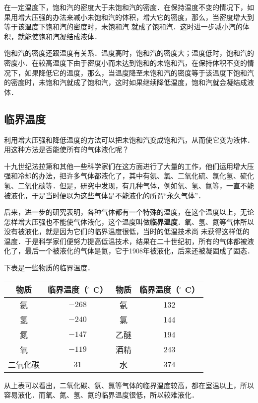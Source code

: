 在一定温度下，饱和汽的密度大于未饱和汽的密度．在保持温度不变的情况下，如果用增大压强的办法来减小未饱和汽的体积，增大它的密度，那么，当密度增大到等于该温度下饱和汽的密度时，未饱和汽
就成了饱和汽．这时进一步减小汽的体积，就能使饱和汽凝结成液体．

饱和汽的密度还跟温度有关系．温度高时，饱和汽的密度大；温度低时，饱和汽的密度小．在较高温度下由于密度小而未达到饱和的未饱和汽，在保持体积不变的情况下，如果降低它的温度，那么，当温度降至未饱和汽的密度等于该温度下饱和汽的密度时，未饱和汽就成了饱和汽，这时如果继续降低温度，饱和汽就会凝结成液体．

\subsection{临界温度}

利用增大压强和降低温度的方法可以把未饱和汽变成饱和汽，从而使它变为液体．用这种方法是否能使所有的气体液化呢？

十九世纪法拉第和其他一些科学家们在这方面进行了大量的工作，他们运用增大压强和冷却的办法，把许多气体都液化了，其中有氨、氯、二氧化硫、氯化氢、硫化氢、二氧化碳等．但是，研究中发现，有几种气体，例如氧、氢、氮等，一直不能被液化，于是当时便以为这些气体是不能液化的所谓“永久气体”．

后来，进一步的研究表明，各种气体都有一个特殊的温度，在这个温度以上，无论怎样增大压强也不能使气体液化，这个温度叫做\textbf{临界温度}．氧、氢、氮等气体所以没有被液化，就是因为它们的临界温度很低，当时的低温技术尚
未获得这样低的温度．于是科学家们便努力提高低温技术，结果在二十世纪初，所有的气体都被液化了，最后一个被液化的气体是氦，它于1908年被液化，后来还被凝固成了固态．

下表是一些物质的临界温度．

\begin{center}
    \begin{tabular}{cccc}
\hline
  物质 &临界温度（$^\circ$ C）&物质 &临界温度（$^\circ$ C）\\
\hline
  氦&$-268$  & 氨 & 132 \\
氢&$-240$  & 氯 & 144 \\
氮&$-147$  & 乙醚 & 194 \\
氧&$-119$  & 酒精 & 243 \\
二氧化碳&31  & 水 & 374 \\
\hline
  \end{tabular}
\end{center}

从上表可以看出，二氧化碳、氨、氯等气体的临界温度较高，都在室温以上，所以容易液化．而氧、氮、氢、氦的临界温度很低，所以较难液化．

